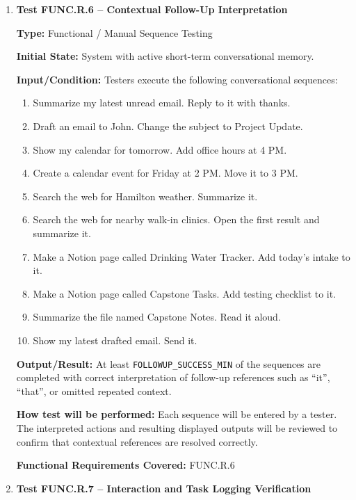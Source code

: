 \documentclass[12pt, titlepage]{article}
\begin{document}
\begin{enumerate}

\item \textbf{Test FUNC.R.6 -- Contextual Follow-Up Interpretation}

\textbf{Type:} Functional / Manual Sequence Testing

\textbf{Initial State:} System with active short-term conversational
memory.

\textbf{Input/Condition:} Testers execute the following conversational
sequences:

{\renewcommand{\labelenumii}{\arabic{enumii}.}
\begin{enumerate}
  \item Summarize my latest unread email. Reply to it with thanks.
  \item Draft an email to John. Change the subject to Project Update.
  \item Show my calendar for tomorrow. Add office hours at 4 PM.
  \item Create a calendar event for Friday at 2 PM. Move it to 3 PM.
  \item Search the web for Hamilton weather. Summarize it.
  \item Search the web for nearby walk-in clinics. Open the first result
  and summarize it.
  \item Make a Notion page called Drinking Water Tracker. Add today's
  intake to it.
  \item Make a Notion page called Capstone Tasks. Add testing checklist
  to it.
  \item Summarize the file named Capstone Notes. Read it aloud.
  \item Show my latest drafted email. Send it.
\end{enumerate}
}

\textbf{Output/Result:} At least \texttt{FOLLOWUP\_SUCCESS\_MIN} of the
sequences are completed with correct interpretation of follow-up
references such as ``it'', ``that'', or omitted repeated context.

\textbf{How test will be performed:} Each sequence will be entered by a
tester. The interpreted actions and resulting displayed outputs will be
reviewed to confirm that contextual references are resolved correctly.

\textbf{Functional Requirements Covered:} FUNC.R.6

\item \textbf{Test FUNC.R.7 -- Interaction and Task Logging Verification}


\end{enumerate}
\end{document}
